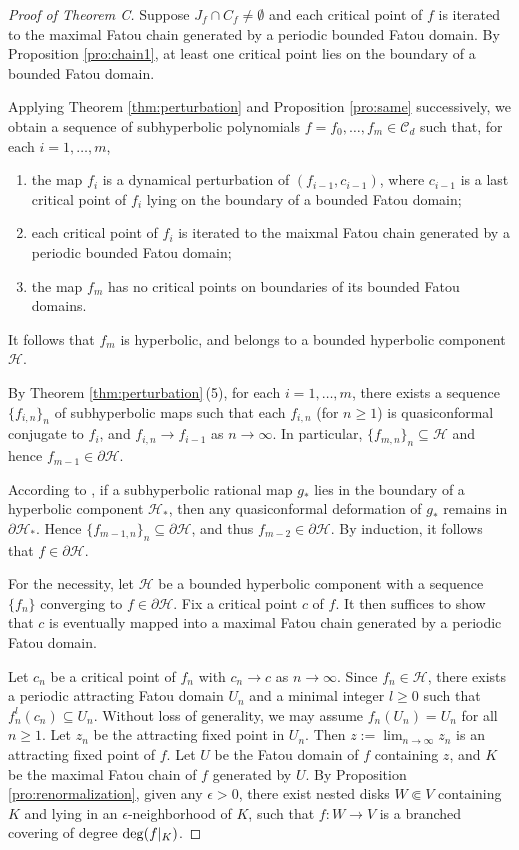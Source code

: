 \documentclass[a4paper,reqno,times, 11pt]{amsart}
\theoremstyle{remark}
\theoremstyle{plain}
\numberwithin{equation}{section}
\def\HHHH{\mathscr H}
\def\CCCC{\mathscr C}
\begin{document}
\begin{proof}[Proof of Theorem C]
	
	Suppose $J_f\cap C_f\neq \emptyset$ and each critical point of $f$ is iterated to the maximal Fatou chain generated by a periodic bounded Fatou domain. By Proposition \ref{pro:chain1}, at least one critical point lies on the boundary of a bounded Fatou domain.
	
	Applying Theorem \ref{thm:perturbation}  and Proposition \ref{pro:same} successively, we obtain a sequence of subhyperbolic polynomials $f=f_0,\ldots,f_m\in \CCCC_d$
	such that, for each $i=1,\ldots,m$,
	\begin{enumerate}
		\item the map $f_{i}$ is a dynamical perturbation of $(f_{i-1},c_{i-1})$, where $c_{i-1}$ is a last critical point of $f_i$ lying on the boundary of a bounded Fatou domain;
		\item each critical point of $f_i$ is iterated to the maixmal Fatou chain generated by a periodic bounded Fatou domain;
		\item the map $f_m$ has no critical points on boundaries of its bounded Fatou domains.
	\end{enumerate}
	It follows that $f_m$ is hyperbolic, and belongs to a bounded hyperbolic component $\HHHH$.
	
	By Theorem \ref{thm:perturbation}\,(5), for each $i=1,\ldots,m$, there exists a sequence $\{f_{i,n}\}_{n}$ of subhyperbolic maps such that each $f_{i,n}$ (for $n\geq1$) is quasiconformal conjugate to $f_i$, and $f_{i,n}\to f_{i-1}$ as $n\to\infty$. In particular, $\{f_{m,n}\}_{n}\subseteq\HHHH$ and hence $f_{m-1}\in\partial \HHHH$.
	
	According to \cite[Theorem 1.1]{GYZ}, if a subhyperbolic rational map $g_*$ lies in the boundary of a hyperbolic component $\HHHH_*$, then any quasiconformal deformation of $g_*$ remains in $\partial \HHHH_*$. Hence $\{f_{m-1,n}\}_{n}\subseteq\partial\HHHH$, and thus $f_{m-2}\in\partial\HHHH$. By induction, it follows that $f\in\partial\HHHH$.
	\vspace{3pt}
	
	For the necessity, let $\HHHH$ be a bounded hyperbolic component with a sequence $\{f_n\}$ converging to $f\in\partial\HHHH$. Fix a critical point $c$ of $f$. It then suffices to show that $c$ is eventually mapped into a maximal Fatou chain generated by a periodic Fatou domain.
	
	
	Let $c_n$ be a critical point of $f_n$ with $c_n\to c$ as $n\to \infty$.
	Since $f_n\in\HHHH$, there exists a periodic attracting Fatou domain $ U_n$ and a minimal integer $l\geq0$ such that $f_n^l(c_n)\subseteq  U_n$. Without loss of generality, we may assume $f_n( U_n)= U_n$ for all $n\geq1$. Let $z_n$ be the attracting fixed point in $ U_n$. Then $z:=\lim_{n\to\infty} z_n$ is an attracting fixed point of $f$.
	Let $ U$ be the Fatou domain of $f$ containing $z$, and $K$ be the maximal Fatou chain of $f$ generated by $ U$.
	By Proposition \ref{pro:renormalization}, given any $\epsilon>0$, there exist nested disks $W\Subset V$ containing $K$ and lying in an $\epsilon$-neighborhood of $K$, such that $f:W\to V$ is a branched covering of degree ${\rm deg}(f|_K)$.
	

\end{proof}
\end{document}

